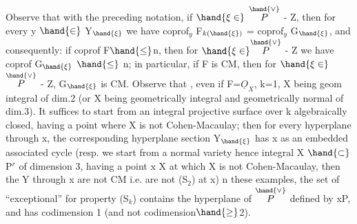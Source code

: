
Observe that with the preceding notation, if $\hand{\xi\in}$ $\overset{\hand{\vee}}{P}$ - Z, then for every
y $\hand{\in}$ Y$_{\hand{\xi}}$ we have coprof$_y$ F$_{k(\hand{\xi})}$ = coprof$_y$ G$_{\hand{\xi}}$, and consequently: if coprof F$\hand{\leq}$n,
then for $\hand{\xi\in}\overset{\hand{\vee}}{P}$ - Z we have coprof G$_{\hand{\xi}}$ $\hand{\leq}$ n; in particular, if F is CM, then
for $\hand{\xi\in}$ $\overset{\hand{\vee}}{P}$ - Z, G$_{\hand{\xi}}$ is CM. 
 Observe that  
, even if F=$\underline{O}_X$, k=1, X being geom integral of dim.2 (or  X being
geometrically integral and geometrically normal of dim.3). It suffices
to start from an integral projective surface   over k algebraically
closed, having a point  where X is not Cohen-Macaulay; then for every
hyperplane through x, the corresponding hyperplane section Y$_{\hand{\xi}}$ has
x as an embedded associated cycle (resp. we start from a normal variety\hand{,} \hand{(}hence
 integral X $\hand{\subset}$ P$^r$ of dimension 3, having a point x \hand{$\in$} X at which X is not
Cohen-Macaulay, then the Y through x are not  CM i.e. are
not (S$_2$) at x) n these examples, the set of \hand{$\xi$} “exceptional”
for property (S$_k$) contains the hyperplane of $\overset{\hand{\vee}}{P}$ defined by x\hand{$\in$}P, and has
codimension 1 (and not codimension$\hand{\geq}$2). 

